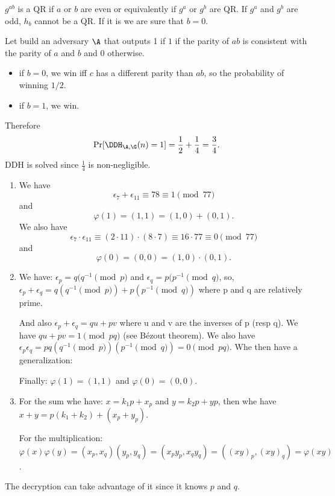\begin{solution}
\begin{enumerate}
		$g^{ab}$ is a QR if $a$ or $b$ are even or equivalently
		if $g^a$ or $g^b$ are QR.
		If $g^a$ and $g^b$ are odd, $h_b$ cannot be a QR.
		If it is we are sure that $b = 0$.
		
		Let build an adversary $\A$ that outputs 1 if $1$ if the parity of
		$ab$ is consistent with the parity of $a$ and $b$ and $0$ otherwise.
		\begin{itemize}
			\item if $b = 0$, we win iff $c$ has a different parity than $ab$, so the probability of winning $1/2$.
			\item if $b = 1$, we win.
		\end{itemize}
		Therefore
		\[ \Pr[\DDH_{\A,\G}(n) = 1] = \frac{1}{2} + \frac{1}{4} = \frac{3}{4}. \]
		DDH is solved since $\frac{1}{4}$ is non-negligible.
	\end{enumerate}
\end{solution}


\begin{solution}
	\begin{enumerate}
		\item
		We have
		\[ \epsilon_7 + \epsilon_{11} \equiv 78 \equiv 1 \pmod{77} \]
		and
		\[ \varphi(1) = (1,1) = (1,0) + (0,1). \]
		We also have
		\[ \epsilon_7 \cdot \epsilon_{11} \equiv (2 \cdot 11) \cdot (8 \cdot 7) \equiv 16 \cdot 77 \equiv 0 \pmod{77} \]
		and
		\[ \varphi(0) = (0,0) = (1,0) \cdot (0,1). \]
		\item           
		We have: $\epsilon_p = q(q^{-1} \pmod{p}$ and $\epsilon_q = p(p^{-1} \pmod{q}$, so, $\epsilon_p + \epsilon_q = q(q^{-1} \pmod{p}) + p(p^{-1} \pmod{q})$ where p and q are relatively prime.
		
		
		And also $\epsilon_p + \epsilon_q = q u + p v$ where u and v are the inverses of p (resp q). We have $q u + p v = 1 \pmod{pq}$ (see Bézout theorem).
		We also have $\epsilon_p \epsilon_q = pq(q^{-1} \pmod{p})(p^{-1} \pmod{q}) = 0 \pmod{pq}$. Whe then have a generalization:
		
		
		Finally: $\varphi(1) = (1, 1)$ and $\varphi(0) = (0, 0)$.
		
		\item
		For the sum whe have: $x = k_1 p + x_p$ and $y = k_2 p + yp$, then whe have $x + y = p(k_1 + k_2) + (x_p + y_p)$.
		
		
		For the multiplication: $\varphi(x)\varphi(y) = (x_p, x_q)(y_p, y_q) = (x_p y_p, x_qy_q) = ((xy)_p, (xy)_q) = \varphi(xy)$.
	\end{enumerate}
	
	
	The decryption can take advantage of it since it knows $p$ and $q$.
\end{solution}


